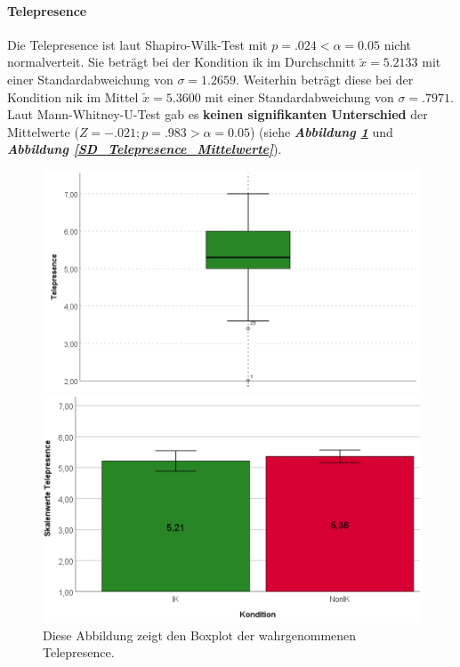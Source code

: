 \documentclass[a4paper,11pt]{article}%
\renewcommand{\\}{\vspace*{0.5\baselineskip} \newline}
\begin{document}
\paragraph{Telepresence} 
Die Telepresence ist laut Shapiro-Wilk-Test mit $p = .024 < \alpha = 0.05$ nicht normalverteit. 
Sie beträgt bei der Kondition \ac{ik} im Durchschnitt $\tilde x = 5.2133$ mit einer Standardabweichung von $\sigma = 1.2659$.
Weiterhin beträgt diese bei der Kondition \ac{nik} im Mittel $\tilde x = 5.3600$ mit einer Standardabweichung von $\sigma = .7971$. 
Laut Mann-Whitney-U-Test gab es \textbf{keinen signifikanten Unterschied} der Mittelwerte ($ Z = -.021; p = .983 > \alpha = 0.05$) (siehe \textbf{\textit{Abbildung \ref{SD_Telepresence}}} und \textbf{\textit{Abbildung \ref{SD_Telepresence_Mittelwerte}}}).

	\begin{figure}[H]
   \begin{minipage}[t]{.5\linewidth} %
      \includegraphics[width=\linewidth]{Abbildungen/AuswertungDiagramme/BP_Telepresence.png}
      \caption[Boxplot der wahrgenommenen Telepresence]{Diese Abbildung zeigt den Boxplot der wahrgenommenen Telepresence.}
            \label{SD_Telepresence}
   \end{minipage}
   \hspace{.02\linewidth}%
   \begin{minipage}[t]{.5\linewidth} %
     \includegraphics[width=\linewidth]{Abbildungen/AuswertungDiagramme/SD_Telepresence_Mittelwerte.png}

\end{minipage}
\end{figure}
\end{document}
